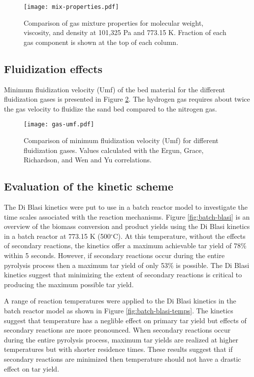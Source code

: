 \begin{figure}[H]
    \centering
    \texttt{[image: mix-properties.pdf]}
    \caption{Comparison of gas mixture properties for molecular weight, viscosity, and density at 101,325 Pa and 773.15 K. Fraction of each gas component is shown at the top of each column.}
    \label{fig:mix-properties}
\end{figure}

\subsection{Fluidization effects}

Minimum fluidization velocity (Umf) of the bed material for the different fluidization gases is presented in Figure \ref{fig:gas-umf}. The hydrogen gas requires about twice the gas velocity to fluidize the sand bed compared to the nitrogen gas.

\begin{figure}[H]
    \centering
    \texttt{[image: gas-umf.pdf]}
    \caption{Comparison of minimum fluidization velocity (Umf) for different fluidization gases. Values calculated with the Ergun, Grace, Richardson, and Wen and Yu correlations.}
    \label{fig:gas-umf}
\end{figure}

\subsection{Evaluation of the kinetic scheme}

The Di Blasi kinetics were put to use in a batch reactor model to investigate the time scales associated with the reaction mechanisms. Figure \ref{fig:batch-blasi} is an overview of the biomass conversion and product yields using the Di Blasi kinetics in a batch reactor at 773.15 K (500$^\circ$C). At this temperature, without the effects of secondary reactions, the kinetics offer a maximum achievable tar yield of 78\% within 5 seconds. However, if secondary reactions occur during the entire pyrolysis process then a maximum tar yield of only 53\% is possible. The Di Blasi kinetics suggest that minimizing the extent of secondary reactions is critical to producing the maximum possible tar yield.

A range of reaction temperatures were applied to the Di Blasi kinetics in the batch reactor model as shown in Figure \ref{fig:batch-blasi-temps}. The kinetics suggest that temperature has a neglible effect on primary tar yield but effects of secondary reactions are more pronounced. When secondary reactions occur during the entire pyrolysis process, maximum tar yields are realized at higher temperatures but with shorter residence times. These results suggest that if secondary reactions are minimized then temperature should not have a drastic effect on tar yield.

